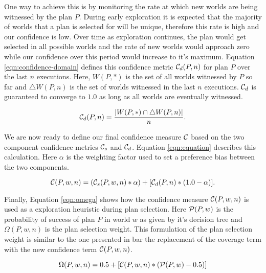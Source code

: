 One way to achieve this is by monitoring the rate at which new worlds are being witnessed by the plan $P$. During early exploration it is expected that the majority of worlds that a plan is selected for will be unique, therefore this rate is high and our confidence is low. Over time as exploration continues, the plan would get selected in all possible worlds and the rate of new worlds would approach zero while our confidence over this period would increase to it's maximum.  Equation \ref{eqn:confidence-domain} defines this confidence metric $\C_d(P,n)$ for plan $P$ over the last $n$ executions. Here, $W(P,*)$ is the set of all worlds witnessed by $P$ so far and $\triangle W(P,n)$ is the set of worlds witnessed in the last $n$ executions. $\C_d$ is guaranteed to converge to $1.0$ as long as all worlds are eventually witnessed.

\begin{equation}
\C_d(P,n) = \frac{|W(P,*)\cap \triangle W(P,n) |}{n}.
\label{eqn:confidence-domain}
\end{equation}

We are now ready to define our final confidence measure $\C$ based on the two component confidence metrics $\C_s$ and $\C_d$. Equation \ref{eqn:equation} describes this calculation. Here $\alpha$ is the weighting factor used to set a preference bias between the two components.

\begin{equation}
\C(P,w,n) = (\C_s(P,w,n)*\alpha) + [\C_d(P,n)*(1.0-\alpha)].
\label{eqn:confidence}
\end{equation}

Finally, Equation \ref{eqn:omega} shows how the confidence measure $\C(P,w,n)$ is used as a exploration heuristic during plan selection. Here $\P(P,w)$ is the probability of success of plan $P$ in world $w$ as given by it's decision tree and $\Omega(P,w,n)$ is the plan selection weight. This formulation of the plan selection weight is similar to the one presented in \cite{singh10:extending} bar the replacement of the coverage term with the new confidence term $\C(P,w,n)$.

\begin{equation}
\Omega(P,w,n) = 0.5 + \left[  \C(P,w,n) *  \left( \P(P,w) - 0.5 \right)  \right]
\label{eqn:omega}   
\end{equation}


